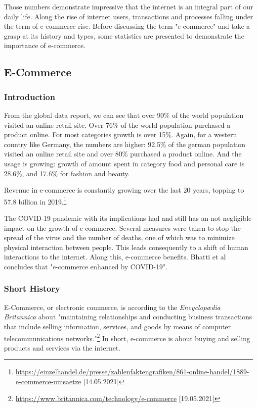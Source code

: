 Those numbers demonstrate impressive that the internet is an integral part of our daily life.
Along the rise of internet users, transactions and processes falling under the term of e-commerce rise.
Before discussing the term "e-commerce" and take a grasp at its history and types, some statistics are presented to demonstrate the importance of e-commerce.


\subsection{E-Commerce}

\subsubsection{Introduction}

From the global data report, we can see that over 90\% of the world population visited an online retail site.
Over 76\% of the world population purchased a product online.
For most categories growth is over 15\%.
Again, for a western country like Germany, the numbers are higher:
92.5\% of the german population visited an online retail site and over 80\% purchased a product online.
And the usage is growing: growth of amount spent in category food and personal care is 28.6\%, and 17.6\% for fashion and beauty.

Revenue in e-commerce is constantly growing over the last 20 years, topping to 57.8 billion in 2019.\footnote{\url{https://einzelhandel.de/presse/zahlenfaktengrafiken/861-online-handel/1889-e-commerce-umsaetze} [14.05.2021]}


The COVID-19 pandemic with its implications had and still has an not negligible impact on the growth of e-commerce.
Several measures were taken to stop the spread of the virus and the number of deaths, one of which was to minimize physical interaction between people.
This leads consequently to a shift of human interactions to the internet.
Along this, e-commerce benefits.
Bhatti et al concludes that "e-commerce enhanced by COVID-19". %

\subsubsection{Short History}

E-Commerce, or electronic commerce, is according to the \textit{Encyclopædia Britannica} about "maintaining relationships and conducting business transactions that include selling information, services, and goods by means of computer telecommunications networks."\footnote{\url{https://www.britannica.com/technology/e-commerce} [19.05.2021]}
In short, e-commerce is about buying and selling products and services via the internet.


